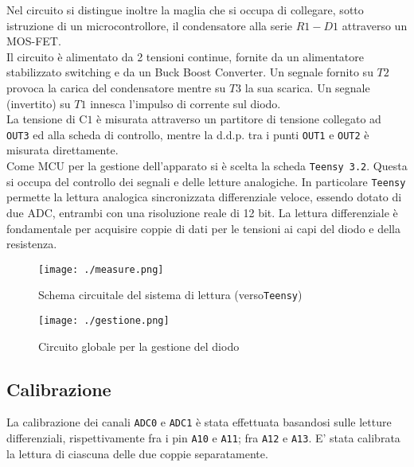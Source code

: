 \documentclass{article}[a4paper, oneside, 11pt]
\begin{document}
Nel circuito si distingue inoltre la maglia che si occupa di collegare, sotto
istruzione di un microcontrollore, il condensatore alla serie $R1-D1$
attraverso un MOS-FET.\\
Il circuito è alimentato da 2 tensioni continue, fornite da un alimentatore
stabilizzato switching e da un Buck Boost Converter.
Un segnale fornito su $T2$ provoca la carica del condensatore mentre su $T3$
la sua scarica. Un segnale (invertito) su $T1$ innesca l'impulso di corrente
sul diodo.\\
La tensione di C$1$ è misurata attraverso un partitore di tensione collegato 
ad \verb+OUT3+ ed alla scheda di controllo, mentre la d.d.p. tra i punti
\verb+OUT1+ e \verb+OUT2+ è misurata direttamente.\\
Come MCU per la gestione dell'apparato si è scelta la scheda 
\verb+Teensy 3.2+\cite{teensy}. Questa si occupa del controllo dei segnali e 
delle letture analogiche. In particolare \verb+Teensy+ permette la lettura
analogica sincronizzata differenziale veloce, essendo dotato di due ADC,
entrambi con una risoluzione reale di 12 bit. La lettura differenziale è
fondamentale per acquisire coppie di dati per le tensioni ai capi del diodo
e della resistenza.

\begin{figure}[!htb]
	\centering 
 		\texttt{[image: ./measure.png]}
 	\caption{Schema circuitale del sistema di lettura (verso\texttt{Teensy})
	\label{sch:rdng}}
\end{figure}

\begin{figure}[h!t]%
	\centering 
 		\texttt{[image: ./gestione.png]}
 	\caption{Circuito globale per la gestione del diodo \label{sch:gest}}
\end{figure}

\subsection{Calibrazione}\label{sec: cal}

La calibrazione dei canali \verb+ADC0+ e \verb+ADC1+ è stata effettuata
basandosi sulle letture differenziali, rispettivamente fra i pin \verb+A10+
e \verb+A11+; fra \verb+A12+ e \verb+A13+. E’ stata calibrata la lettura
di ciascuna delle due coppie separatamente.
\end{document}
